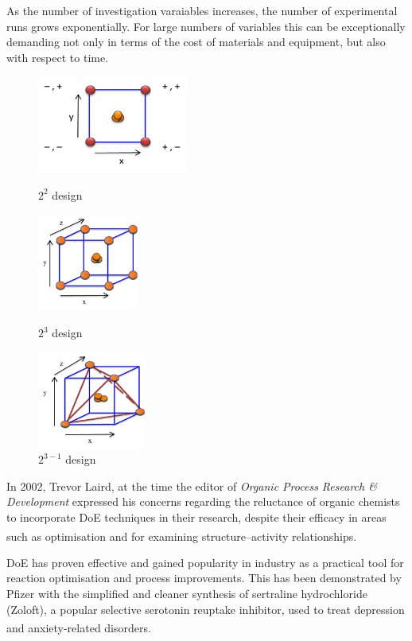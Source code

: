 As the number of investigation varaiables increases, the number of experimental runs grows exponentially. For large numbers of variables this can be exceptionally demanding not only in terms of the cost of materials and equipment, but also with respect to time. 

\begin{figure}
\centering
\begin{minipage}{0.3\textwidth}
   \centering
   \includegraphics[height=3.2cm]{gfx/doe-3} %
   \caption{$2^2$ design}
   \label{fig:doe-3}
\end{minipage}\hfill
\begin{minipage}{0.3\textwidth}
   \centering
   \includegraphics[height=3.2cm]{gfx/doe-4} %
   \caption{$2^3$ design}
   \label{fig:doe-4}
\end{minipage}\hfill
\begin{minipage}{0.3\textwidth}
   \centering
   \includegraphics[height=3.2cm]{gfx/doe-5} %
   \caption{$2^{3-1}$ design}
   \label{fig:doe-5}
\end{minipage}
\end{figure}

In 2002, Trevor Laird, at the time the editor of \textit{Organic Process Research \& Development} expressed his concerns regarding the reluctance of organic chemists to incorporate DoE techniques in their research, despite their efficacy in areas such as optimisation and for examining structure--activity relationships.\textsuperscript{\cite{laird:2002}}

DoE has proven effective and gained popularity in industry as a practical tool for reaction optimisation and process improvements. This has been demonstrated by Pfizer with the simplified and cleaner synthesis of sertraline hydrochloride (Zoloft), a popular selective serotonin reuptake inhibitor, used to treat depression and anxiety-related disorders.\textsuperscript{\cite{taber:2004}}
